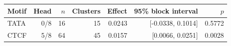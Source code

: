 \begin{tabular}{lrrrrrr}
\toprule
Motif & Head & $n$ & Clusters & Effect & 95\% block interval & $p$ \\
\midrule
TATA & 0/8 & 16 & 15 & 0.0243 & [-0.0338, 0.1014] & 0.5772 \\
CTCF & 5/8 & 64 & 45 & 0.0157 & [0.0066, 0.0251] & 0.0028 \\
\bottomrule
\end{tabular}